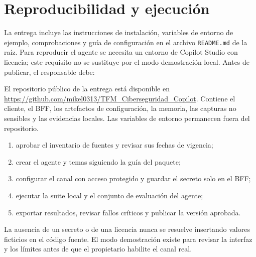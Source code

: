 \chapter{Reproducibilidad y ejecuci\'on}
\label{apx:reproducibilidad}

La entrega incluye las instrucciones de instalaci\'on, variables de entorno de ejemplo, comprobaciones y gu\'ia de configuraci\'on en el archivo \texttt{README.md} de la ra\'iz. Para reproducir el agente se necesita un entorno de Copilot Studio con licencia; este requisito no se sustituye por el modo demostraci\'on local. Antes de publicar, el responsable debe:

El repositorio p\'ublico de la entrega est\'a disponible en \url{https://github.com/mikel0313/TFM_Ciberseguridad_Copilot}. Contiene el cliente, el BFF, los artefactos de configuraci\'on, la memoria, las capturas no sensibles y las evidencias locales. Las variables de entorno permanecen fuera del repositorio.

\begin{enumerate}
  \item aprobar el inventario de fuentes y revisar sus fechas de vigencia;
  \item crear el agente y temas siguiendo la gu\'ia del paquete;
  \item configurar el canal con acceso protegido y guardar el secreto solo en el BFF;
  \item ejecutar la suite local y el conjunto de evaluaci\'on del agente;
  \item exportar resultados, revisar fallos cr\'iticos y publicar la versi\'on aprobada.
\end{enumerate}

La ausencia de un secreto o de una licencia nunca se resuelve insertando valores ficticios en el c\'odigo fuente. El modo demostraci\'on existe para revisar la interfaz y los l\'imites antes de que el propietario habilite el canal real.
